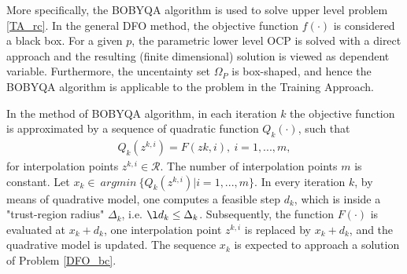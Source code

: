 More specifically, the BOBYQA algorithm is used to solve upper level problem \ref{TA_rc}. In the general DFO method, the objective function $f(\cdot)$ is considered a black box. For a given $p$, the parametric lower level OCP is solved with a direct approach and the resulting (finite dimensional) solution is viewed as dependent variable. Furthermore, the uncentainty set $\Omega_P$ is box-shaped, and hence the BOBYQA algorithm is applicable to the problem in the Training Approach.

In the method of BOBYQA algorithm, in each iteration $k$ the objective function is approximated by a sequence of quadratic function $Q_k(\cdot)$, such that 
\begin{equation}
	\begin{aligned}
Q_k(z^{k,i}) = F(z{k,i}), \   i = 1, ..., m,
	\end{aligned}
	\label{BOBYQA}
\end{equation}
for interpolation points $z^{k,i} \in \mathcal{R}$. The number of interpolation points $m$ is constant. Let $x_k \in \ argmin \ \{Q_k(z^{k,i}) | i=1, ...,m\}$. In every iteration $k$, by means of quadrative model, one computes a feasible step $d_k$, which is inside a "trust-region radius" $\Delta_k$, i.e. $\l d_k \leq \Delta_k$. Subsequently, the function $F(\cdot)$ is evaluated at $x_k + d_k$, one interpolation point $z^{k,i}$ is replaced by $x_k + d_k$, and the quadrative model is updated. The sequence $x_k$ is expected to approach a solution of Problem \ref{DFO_bc}.

 














